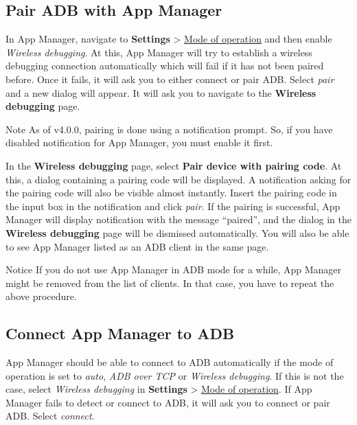 \subsection{Pair ADB with App Manager}\label{subsec:pair-adb-with-app-manager} %
In App Manager, navigate to \textbf{Settings} > \hyperref[subsec:mode-of-operation]{Mode of operation}
and then enable \textit{Wireless debugging}. At this, App Manager will try to establish a wireless
debugging connection automatically which will fail if it has not been paired before. Once it fails,
it will ask you to either connect or pair ADB\@. Select \textit{pair} and a new dialog will appear.
It will ask you to navigate to the \textbf{Wireless debugging} page.

\begin{tip}{Note}
    As of v4.0.0, pairing is done using a notification prompt. So, if you have disabled notification
    for App Manager, you must enable it first.
\end{tip}

In the \textbf{Wireless debugging} page, select \textbf{Pair device with pairing code}. At this, a
dialog containing a pairing code will be displayed. A notification asking for the pairing code will
also be visible almost instantly. Insert the pairing code in the input box in the notification
and click \textit{pair}. If the pairing is successful, App Manager will display notification with
the message ``paired'', and the dialog in the \textbf{Wireless debugging} page will be dismissed
automatically. You will also be able to see App Manager listed as an ADB client in the same page.

\begin{tip}{Notice}
    If you do not use App Manager in ADB mode for a while, App Manager might be removed from the
    list of clients. In that case, you have to repeat the above procedure.
\end{tip}

\subsection{Connect App Manager to ADB}\label{subsec:connect-app-manager-to-adb} %
App Manager should be able to connect to ADB automatically if the mode of operation is set to
\textit{auto}, \textit{ADB over TCP} or \textit{Wireless debugging}. If this is not the case, select
\textit{Wireless debugging} in \textbf{Settings} > \hyperref[subsec:mode-of-operation]{Mode of operation}.
If App Manager fails to detect or connect to ADB, it will ask you to connect or pair ADB. Select
\textit{connect}.

